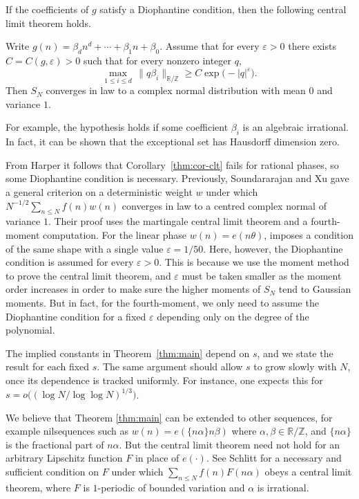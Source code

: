If the coefficients of $g$ satisfy a Diophantine condition, then the following central limit theorem holds.
\begin{coro}\label{thm:cor-clt}
Write $g(n)=\beta_d n^d+\cdots+\beta_1 n+\beta_0$. Assume that for every $\varepsilon>0$ there exists $C=C(g,\varepsilon)>0$ such that for every nonzero integer $q$,
\[
\max_{1\leq i\leq d}\,\|q\beta_i\|_{\mathbb{R}/\mathbb{Z}}
\geq C\exp\bigl(-|q|^{\varepsilon}\bigr).
\]
Then $S_N$ converges in law to a complex normal distribution with mean $0$ and variance $1$.
\end{coro}


For example, the hypothesis holds if some coefficient \(\beta_i\) is an algebraic irrational. In fact, it can be shown that the exceptional set has Hausdorff dimension zero.

From Harper \cite{HarperI} it follows that Corollary~\ref{thm:cor-clt} fails for rational phases, so some Diophantine condition is necessary.
Previously, Soundararajan and Xu \cite{KX} gave a general criterion on a deterministic weight $w$ under which $N^{-1/2}\sum_{n\le N}f(n)w(n)$ converges in law to a centred complex normal of variance $1$. Their proof uses the martingale central limit theorem and a fourth-moment computation. For the linear phase $w(n)=e(n\theta)$, \cite[Theorem~1.6]{KX} imposes a condition of the same shape with a single value $\varepsilon=1/50$.
Here, however, the Diophantine condition is assumed for every $\varepsilon>0$. This is because we use the moment method to prove the central limit theorem, and $\varepsilon$ must be taken smaller as the moment order increases
in order to make sure the higher moments of $S_N$ tend to Gaussian moments. But in fact, for the fourth-moment, we only need to assume the Diophantine condition for a fixed $\varepsilon$ depending only on the degree of the polynomial.

The implied constants in Theorem~\ref{thm:main} depend on $s$, and we state the result for each fixed $s$. The same argument should allow $s$ to grow slowly with $N$, once its dependence is tracked uniformly. For instance, one expects this for $s=o\bigl((\log N/\log\log N)^{1/3}\bigr)$.

We believe that Theorem \ref{thm:main} can be extended to other sequences, for example
nilsequences such as $w(n)=e(\{n\alpha\}n\beta)$ where $\alpha,\beta\in \mathbb{R}/\mathbb{Z}$, and $\{n\alpha\}$ is the fractional part of $n\alpha$.
But the central limit theorem need not hold for an arbitrary Lipschitz function $F$ in place of $e(\cdot)$.
See Schlitt \cite{Schlitt26} for a necessary and sufficient condition
on \(F\) under which \(\sum_{n\le N}f(n)F(n\alpha)\) obeys a central limit
theorem, where \(F\) is \(1\)-periodic of bounded variation and \(\alpha\)
is irrational. 


